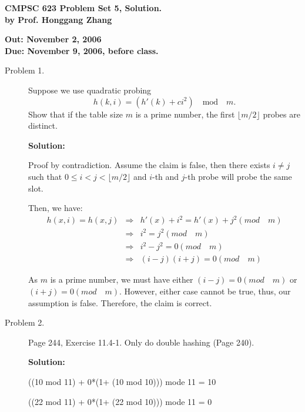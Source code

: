 \documentclass[11pt]{article}
\begin{document}

\begin{center}
{\bf CMPSC 623 Problem Set 5, Solution.} \\
{\bf by Prof. Honggang Zhang} \\
\end{center}
\begin{center}
{\bf Out: November 2, 2006} \\
{\bf Due: November 9, 2006, before class.} \\

\end{center}


\begin{description}

\item[Problem 1.]
Suppose we use quadratic probing
$$
h(k,i)=(h'(k) + c i^2) \quad \mbox{mod} \quad m.
$$
Show that if the table size $m$ is a prime number, the first $\lfloor m/2
\rfloor$ probes are distinct.

\noindent \textbf{Solution:}

Proof by contradiction. Assume the claim is false, then there exists $i\ne j$
such that $0\le i < j < \lfloor m/2 \rfloor$ and $i$-th and $j$-th probe will
probe the same slot.

Then, we have:
\begin{eqnarray}
h(x, i) = h(x,j) &\Rightarrow& h'(x)+i^2 = h'(x) + j^2 (mod \quad m) \\
&\Rightarrow& i^2 = j^2 (mod \quad m) \\
&\Rightarrow& i^2 - j^2 =0 (mod \quad m) \\
&\Rightarrow& (i - j)(i + j) =0 (mod \quad m)
\end{eqnarray}

As $m$ is a prime number, we must have either $(i - j)=0 (mod \quad m)$ or $(i
+ j) = 0 (mod \quad m)$. However, either case cannot be true, thus, our
assumption is false. Therefore, the claim is correct.

\item[Problem 2.]
Page 244, Exercise 11.4-1. Only do double hashing (Page 240).

\noindent \textbf{Solution:}


((10 mod 11) + 0*(1+ (10 mod 10))) mode 11 = 10

((22 mod 11) + 0*(1+ (22 mod 10))) mode 11 = 0


\end{description}
\end{document}
